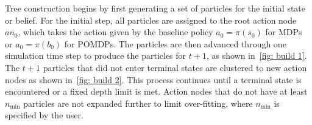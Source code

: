 \documentclass[letterpaper]{article} %
\begin{document}
Tree construction begins by first generating a set of particles for the initial state or belief.  
For the initial step, all particles are assigned to the root action node $an_0$, which takes the action given by the baseline policy $a_0 = \pi(s_0)$ for MDPs or $a_0 = \pi(b_0)$ for POMDPs.
The particles are then advanced through one simulation time step to produce the particles for $t+1$, as shown in~\cref{fig: build 1}.
The $t+1$ particles that did not enter terminal states are clustered to new action nodes as shown in~\cref{fig: build 2}.
This process continues until a terminal state is encountered or a fixed depth limit is met. 
Action nodes that do not have at least $n_{\min}$ particles are not expanded further to limit over-fitting, where $n_{\min}$ is specified by the user. 
\end{document}
